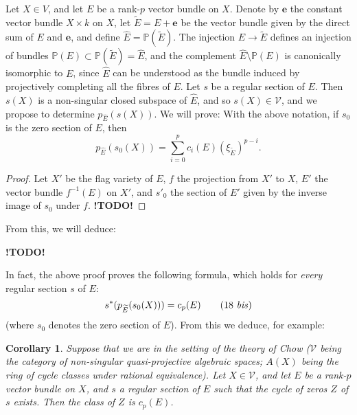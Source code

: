 \documentclass{article}
\theoremstyle{plain}
\newenvironment{theorem}[1]
    {\renewcommand\theinnercustomtheorem{#1}\innercustomtheorem}
    {\endinnercustomtheorem}
\newenvironment{lemma}[1]
    {\renewcommand\theinnercustomlemma{#1}\innercustomlemma}
    {\endinnercustomlemma}
\newtheorem*{corollary}{Corollary}
\theoremstyle{definition}
\newcommand{\cat}{\mathcal}
\newcommand{\todo}{\textbf{ !TODO! }}
\newcommand{\oldpage}[1]{\marginpar{\footnotesize$\Big\vert$ \textit{p.~#1}}}
\begin{document}
\oldpage{152}
Let $X\in V$, and let $E$ be a rank-$p$ vector bundle on $X$.
Denote by $\mathbf{e}$ the constant vector bundle $X\times k$ on $X$, let $\widetilde{E}=E+\mathbf{e}$ be the vector bundle given by the direct sum of $E$ and $\mathbf{e}$, and define $\widehat{E}=\mathbb{P}(\widetilde{E})$.
The injection $E\to\widetilde{E}$ defines an injection of bundles $\mathbb{P}(E)\subset\mathbb{P}(\widetilde{E})=\widehat{E}$, and the complement $\widehat{E}\setminus\mathbb{P}(E)$ is canonically isomorphic to $E$, since $\widehat{E}$ can be understood as the bundle induced by projectively completing all the fibres of $E$.
Let $s$ be a regular section of $E$.
Then $s(X)$ is a non-singular closed subspace of $\widehat{E}$, and so $s(X)\in\cat{V}$, and we propose to determine $p_{\widehat{E}}(s(X))$.
We will prove:
\begin{lemma}{3}
\label{lemma3}
  With the above notation, if $s_0$ is the zero section of $E$, then
  \[
  \label{equation17}
    p_{\widehat{E}}(s_0(X)) = \sum_{i=0}^p c_i(E)(\xi_{\widetilde{E}})^{p-i}.
  \tag{17}
  \]
\end{lemma}

\begin{proof}
  Let $X'$ be the flag variety of $E$, $f$ the projection from $X'$ to $X$, $E'$ the vector bundle $f^{-1}(E)$ on $X'$, and $s'_0$ the section of $E'$ given by the inverse image of $s_0$ under $f$.
  \todo
\end{proof}

From this, we will deduce:

\begin{theorem}{2}
\label{theorem2}
  \todo
\end{theorem}

In fact, the above proof proves the following formula, which holds for \emph{every} regular section $s$ of $E$:
\[
\label{equation18bis}
  s^*(p_{\widetilde{E}}(s_0(X))) = c_p(E)
\tag{18 \emph{bis}}
\]
(where $s_0$ denotes the zero section of $E$).
From this we deduce, for example:

\begin{corollary}
  Suppose that we are in the setting of the theory of Chow ($\cat{V}$ being the category of non-singular quasi-projective algebraic spaces; $A(X)$ being the ring of cycle classes under rational equivalence).
  Let $X\in\cat{V}$, and let $E$ be a rank-$p$ vector bundle on $X$, and $s$ a regular section of $E$ such that the cycle of zeros $Z$ of $s$ exists.
  Then the class of $Z$ is $c_p(E)$.
\end{corollary}
\end{document}
